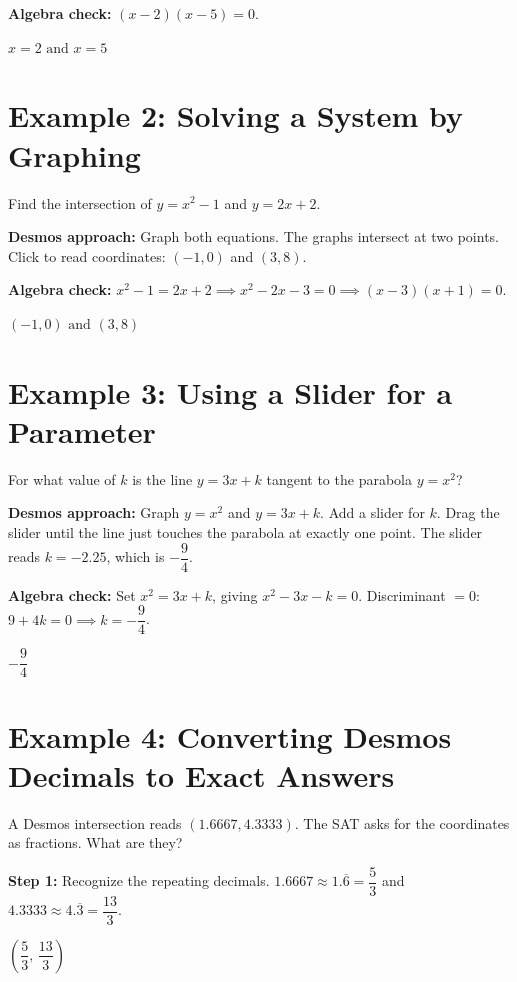 \documentclass[14pt]{extarticle}
\begin{document}
\textbf{Algebra check:} \((x - 2)(x - 5) = 0\).

\(\boxed{x = 2 \text{ and } x = 5}\)

\section*{Example 2: Solving a System by Graphing}

Find the intersection of \(y = x^2 - 1\) and \(y = 2x + 2\).

\textbf{Desmos approach:} Graph both equations. The graphs intersect at two points. Click to read coordinates: \((-1, 0)\) and \((3, 8)\).

\textbf{Algebra check:} \(x^2 - 1 = 2x + 2 \implies x^2 - 2x - 3 = 0 \implies (x-3)(x+1) = 0\).

\(\boxed{(-1, 0) \text{ and } (3, 8)}\)

\section*{Example 3: Using a Slider for a Parameter}

For what value of \(k\) is the line \(y = 3x + k\) tangent to the parabola \(y = x^2\)?

\textbf{Desmos approach:} Graph \(y = x^2\) and \(y = 3x + k\). Add a slider for \(k\). Drag the slider until the line just touches the parabola at exactly one point. The slider reads \(k = -2.25\), which is \(-\dfrac{9}{4}\).

\textbf{Algebra check:} Set \(x^2 = 3x + k\), giving \(x^2 - 3x - k = 0\). Discriminant \(= 0\): \(9 + 4k = 0 \implies k = -\dfrac{9}{4}\).

\(\boxed{-\dfrac{9}{4}}\)

\section*{Example 4: Converting Desmos Decimals to Exact Answers}

A Desmos intersection reads \((1.6667, 4.3333)\). The SAT asks for the coordinates as fractions. What are they?

\textbf{Step 1:} Recognize the repeating decimals. \(1.6667 \approx 1.\overline{6} = \dfrac{5}{3}\) and \(4.3333 \approx 4.\overline{3} = \dfrac{13}{3}\).

\(\boxed{\left(\dfrac{5}{3},\, \dfrac{13}{3}\right)}\)
\end{document}
